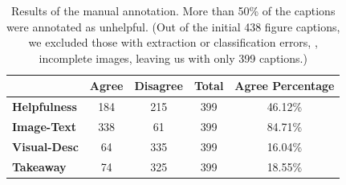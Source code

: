\begin{table}[t]
    \small
    \centering
    \addtolength{\tabcolsep}{-1mm}
    
    \begin{tabular}{@{}lcccc@{}}
    \toprule
    \multicolumn{1}{c}{\textbf{}} & \textbf{Agree} & \textbf{Disagree} & \textbf{Total} & \textbf{Agree Percentage} \\ \midrule
    \textbf{Helpfulness}        & 184 & 215 & 399 & 46.12\% \\
    \textbf{Image-Text}         & 338 & 61 & 399 & 84.71\% \\
    \textbf{Visual-Desc}        & 64 & 335 & 399 & 16.04\% \\
    \textbf{Takeaway}           & 74 & 325 & 399 & 18.55\% \\ \bottomrule
    \end{tabular}
    \addtolength{\tabcolsep}{+1mm}
    \vspace{-1mm}

    \caption{Results of the manual annotation.
    More than 50\% of the captions were annotated as unhelpful. (Out of the initial 438 figure captions, we excluded those with extraction or classification errors, \eg, incomplete images, leaving us with only 399 captions.)}
    \label{tab:quality-annotation-stat}
    \vspace{-2mm}
    
\end{table}
